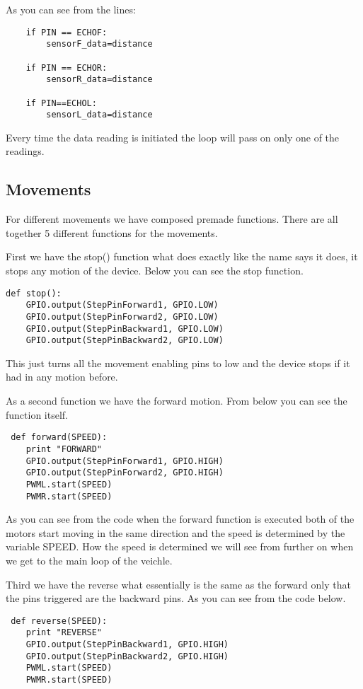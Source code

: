 As you can see from the lines:
\begin{lstlisting}
	if PIN == ECHOF:
		sensorF_data=distance

	if PIN == ECHOR:
		sensorR_data=distance

	if PIN==ECHOL:
		sensorL_data=distance

\end{lstlisting}

Every time the data reading is initiated the loop will pass on only one of the readings.

\subsection{Movements}

For different movements we have composed premade functions.
There are all together 5 different functions for the movements.

First we have the stop() function what does exactly like the name says it does, it stops any motion of the device.
Below you can see the stop function.
\begin{lstlisting}
def stop():
	GPIO.output(StepPinForward1, GPIO.LOW)
	GPIO.output(StepPinForward2, GPIO.LOW)
	GPIO.output(StepPinBackward1, GPIO.LOW)
	GPIO.output(StepPinBackward2, GPIO.LOW)
\end{lstlisting}

This just turns all the movement enabling pins to low and the device stops if it had in any motion before.

As a second function we have the forward motion.
From below you can see the function itself.
\begin{lstlisting}
 def forward(SPEED):
	print "FORWARD"
	GPIO.output(StepPinForward1, GPIO.HIGH)
	GPIO.output(StepPinForward2, GPIO.HIGH)
	PWML.start(SPEED)
	PWMR.start(SPEED)
\end{lstlisting}

As you can see from the code when the forward function is executed both of the motors start moving in the same direction and the speed is determined by the variable SPEED.
How the speed is determined we will see from further on when we get to the main loop of the veichle.

Third we have the reverse what essentially is the same as the forward only that the pins triggered are the backward pins.
As you can see from the code below.

\begin{lstlisting}
 def reverse(SPEED):
	print "REVERSE"
	GPIO.output(StepPinBackward1, GPIO.HIGH)
	GPIO.output(StepPinBackward2, GPIO.HIGH)
	PWML.start(SPEED)
	PWMR.start(SPEED)
\end{lstlisting}

